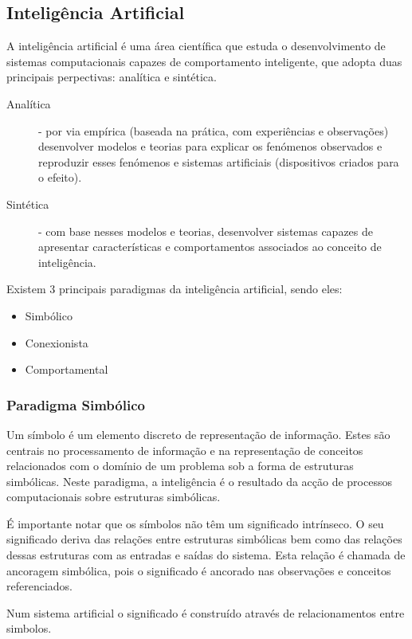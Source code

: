 \documentclass[a4paper,12pt]{article}
\begin{document}
\subsection{Inteligência Artificial} \label{inteligencia_artificial}
A inteligência artificial é uma área científica que estuda o desenvolvimento de sistemas computacionais capazes de comportamento inteligente, que adopta duas principais perpectivas: analítica e sintética.
\begin{description}
	\item[Analítica] - por via empírica (baseada na prática, com experiências e observações) desenvolver modelos e teorias para explicar os fenómenos observados e reproduzir esses fenómenos e sistemas artificiais (dispositivos criados para o efeito).
	\item[Sintética] - com base nesses modelos e teorias, desenvolver sistemas capazes de apresentar características e comportamentos associados ao conceito de inteligência.
\end{description}

Existem 3 principais paradigmas da inteligência artificial, sendo eles:
\begin{itemize}
	\item Simbólico
	\item Conexionista
	\item Comportamental
\end{itemize}

\subsubsection{Paradigma Simbólico} \label{paradigma_simbolico}
Um símbolo é um elemento discreto de representação de informação. Estes são centrais no processamento de informação e na representação de conceitos relacionados com o domínio de um problema sob a forma de estruturas simbólicas.
Neste paradigma, a inteligência é o resultado da acção de processos computacionais sobre estruturas simbólicas.

É importante notar que os símbolos não têm um significado intrínseco. O seu significado deriva das relações entre estruturas simbólicas bem como das relações dessas estruturas com as entradas e saídas do sistema. Esta relação é chamada de ancoragem simbólica, pois o significado é ancorado nas observações e conceitos referenciados.

Num sistema artificial o significado é construído através de relacionamentos entre simbolos.
\end{document}
